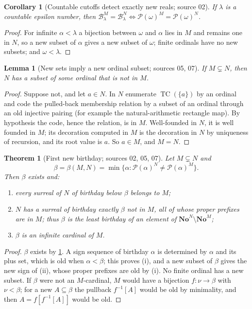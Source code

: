 \documentclass[11pt,letterpaper]{article}
\newtheorem{theorem}{Theorem}[section]
\newtheorem{lemma}[lemma]{Lemma}\aliascntresetthe{lemma}
\newtheorem{corollary}[corollary]{Corollary}\aliascntresetthe{corollary}
\theoremstyle{definition}
\theoremstyle{remark}
\newcommand{\No}{\mathbf{No}}
\newcommand{\TC}{\operatorname{TC}}
\newcommand{\B}{\mathcal B}
\newcommand{\Pow}{\mathcal P}
\begin{document}
\begin{corollary}[Countable cutoffs detect exactly new reals; source 02]
\label{hset:cor:noreals}
If $\lambda$ is a countable epsilon number, then
$\B_\lambda^M=\B_\lambda^N\iff\Pow(\omega)^M=\Pow(\omega)^N$.
\end{corollary}
\begin{proof}
For infinite $\alpha<\lambda$ a bijection between $\omega$ and $\alpha$ lies in
$M$ and remains one in $N$, so a new subset of $\alpha$ gives a new subset of
$\omega$; finite ordinals have no new subsets; and $\omega<\lambda$.
\end{proof}

\begin{lemma}[New sets imply a new ordinal subset; sources 05, 07]
\label{hset:lem:newsubset}
If $M\subsetneq N$, then $N$ has a subset of some ordinal that is not in $M$.
\end{lemma}
\begin{proof}
Suppose not, and let $a\in N$. In $N$ enumerate $\TC(\{a\})$ by an ordinal and
code the pulled-back membership relation by a subset of an ordinal through an
old injective pairing (for example the natural-arithmetic rectangle map). By
hypothesis the code, hence the relation, is in $M$. Well-founded in $N$, it is
well founded in $M$; its decoration computed in $M$ is the decoration in $N$ by
uniqueness of recursion, and its root value is $a$. So $a\in M$, and $M=N$.
\end{proof}

\begin{theorem}[First new birthday; sources 02, 05, 07]
\label{hset:thm:firstbirthday}
Let $M\subsetneq N$ and
\[
 \beta=\beta(M,N)=\min\{\alpha:\Pow(\alpha)^N\ne\Pow(\alpha)^M\}.
\]
Then $\beta$ exists and:
\begin{enumerate}[label=(\roman*)]
\item every surreal of $N$ of birthday below $\beta$ belongs to $M$;
\item $N$ has a surreal of birthday exactly $\beta$ not in $M$, all of whose
proper prefixes are in $M$; thus $\beta$ is the least birthday of an element of
$\No^N\setminus\No^M$;
\item $\beta$ is an infinite cardinal of $M$.
\end{enumerate}
\end{theorem}
\begin{proof}
$\beta$ exists by \cref{hset:lem:newsubset}. A sign sequence of birthday
$\alpha$ is determined by $\alpha$ and its plus set, which is old when
$\alpha<\beta$; this proves (i), and a new subset of $\beta$ gives the new sign
of (ii), whose proper prefixes are old by (i). No finite ordinal has a new
subset. If $\beta$ were not an $M$-cardinal, $M$ would have a bijection
$f:\nu\to\beta$ with $\nu<\beta$; for a new $A\subseteq\beta$ the pullback
$f^{-1}[A]$ would be old by minimality, and then $A=f[f^{-1}[A]]$ would be old.
\end{proof}
\end{document}
